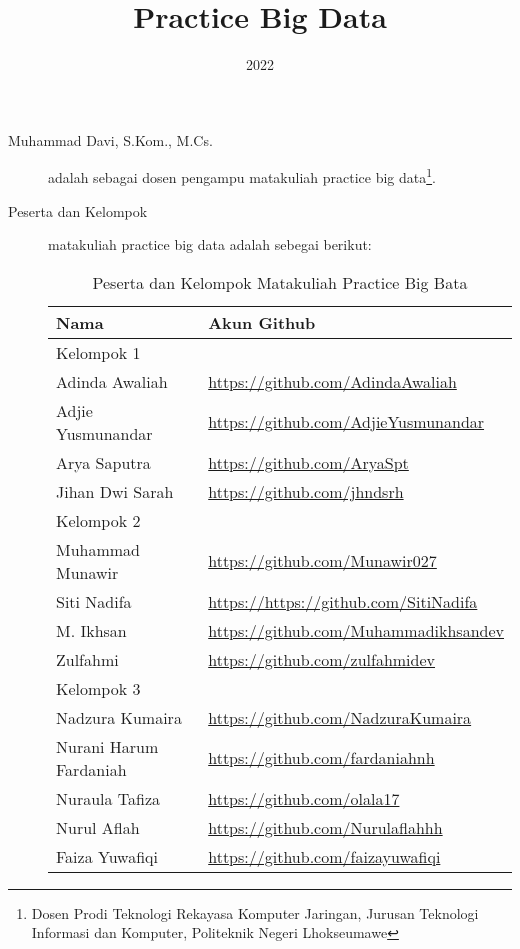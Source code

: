 \documentclass[a4paper]{tufte-handout}
\title{Practice Big Data}
\date{2022}
\begin{document}
\maketitle


\begin{projects}
\begin{description}
\item [Muhammad Davi, S.Kom., M.Cs.] adalah sebagai dosen pengampu matakuliah practice big data\footnote{Dosen Prodi Teknologi Rekayasa Komputer Jaringan, Jurusan Teknologi Informasi dan Komputer, Politeknik Negeri Lhokseumawe}.
\item [Peserta dan Kelompok] matakuliah practice big data adalah sebegai berikut:

\begin{table}[!ht]
\caption{Peserta dan Kelompok Matakuliah Practice Big Bata}
\label{tab:peserta}
\centering
\begin{tabular}{ll} 
\toprule
Nama &	Akun Github\\
\midrule
Kelompok 1\\
\midrule
Adinda Awaliah			& \url{https://github.com/AdindaAwaliah} \\
Adjie Yusmunandar		& \url{https://github.com/AdjieYusmunandar} \\
Arya Saputra			& \url{https://github.com/AryaSpt} \\
Jihan Dwi Sarah			& \url{https://github.com/jhndsrh} \\
\midrule
Kelompok 2\\
\midrule
Muhammad Munawir		& \url{https://github.com/Munawir027} \\
Siti Nadifa			& \url{https://https://github.com/SitiNadifa} \\
M. Ikhsan				& \url{https://github.com/Muhammadikhsandev} \\
Zulfahmi				& \url{https://github.com/zulfahmidev} \\
\midrule
Kelompok 3\\
\midrule
Nadzura Kumaira			& \url{https://github.com/NadzuraKumaira} \\
Nurani Harum Fardaniah	& \url{https://github.com/fardaniahnh} \\
Nuraula Tafiza			& \url{https://github.com/olala17} \\
Nurul Aflah				& \url{https://github.com/Nurulaflahhh} \\
Faiza Yuwafiqi			& \url{https://github.com/faizayuwafiqi} \\

\end{tabular}
\end{table}
\end{description}
\end{projects}
\end{document}
